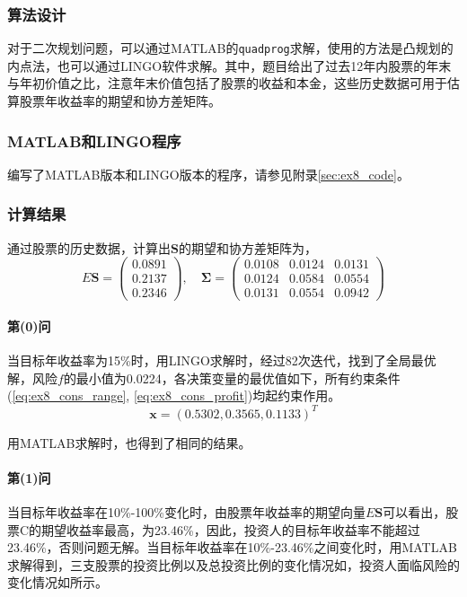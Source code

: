 \documentclass[12pt,a4paper]{article}
\begin{document}
\subsubsection{算法设计}

对于二次规划问题，可以通过MATLAB的\texttt{quadprog}求解，使用的方法是凸规划的内点法，也可以通过LINGO软件求解。其中，题目给出了过去12年内股票的年末与年初价值之比，注意年末价值包括了股票的收益和本金，这些历史数据可用于估算股票年收益率的期望和协方差矩阵。

\subsubsection{MATLAB和LINGO程序}

编写了MATLAB版本和LINGO版本的程序，请参见附录\ref{sec:ex8_code}。

\subsubsection{计算结果}

通过股票的历史数据，计算出$\boldsymbol{S}$的期望和协方差矩阵为，
\begin{equation}
    E\boldsymbol{S} = \left(\begin{matrix}
        0.0891\\
        0.2137\\
        0.2346
    \end{matrix}\right)
    ,\quad
    \boldsymbol{\Sigma} = \left(\begin{matrix}
        0.0108 &   0.0124 &   0.0131\\
        0.0124 &   0.0584 &   0.0554\\
        0.0131 &   0.0554 &   0.0942
    \end{matrix}\right)
\end{equation}

\paragraph{第(0)问} 当目标年收益率为15\%时，用LINGO求解时，经过82次迭代，找到了全局最优解，风险$f$的最小值为0.0224，各决策变量的最优值如下，所有约束条件(\ref{eq:ex8_cons_range}, \ref{eq:ex8_cons_profit})均起约束作用。
\begin{equation}
    \boldsymbol{x} = (0.5302, 0.3565, 0.1133)^T
\end{equation}

用MATLAB求解时，也得到了相同的结果。

\paragraph{第(1)问} 当目标年收益率在10\%-100\%变化时，由股票年收益率的期望向量$E\boldsymbol{S}$可以看出，股票C的期望收益率最高，为23.46\%，因此，投资人的目标年收益率不能超过23.46\%，否则问题无解。当目标年收益率在10\%-23.46\%之间变化时，用MATLAB求解得到，三支股票的投资比例以及总投资比例的变化情况如，投资人面临风险的变化情况如所示。
\end{document}
